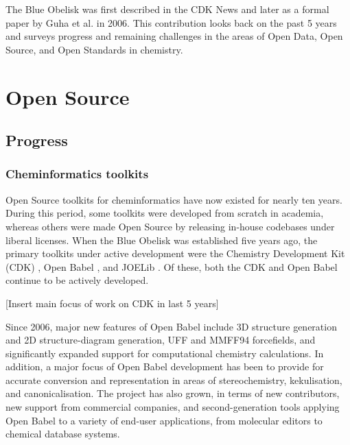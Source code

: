 \documentclass[10pt]{bmc_article}
\newenvironment{bmcformat}{\fussy\setboolean{publ}{true}}{\fussy}
\begin{document}
\begin{bmcformat}
The Blue Obelisk was first described in the CDK News \cite{CDKNewsBO} and
later as a formal paper by Guha et al.\cite{Guha2006} in
2006. This
contribution looks back on the past 5 years and surveys progress and
remaining challenges in the areas of Open Data, Open Source, and Open
Standards in chemistry.

\section*{Open Source}
  \subsection*{Progress}

\subsubsection*{Cheminformatics toolkits}

Open Source toolkits for cheminformatics have now existed for nearly
ten years. During this period, some toolkits were developed from
scratch in academia, whereas others were made Open Source by releasing in-house
codebases under liberal licenses. When the Blue Obelisk was
established five years ago, the primary toolkits under active development
were the Chemistry Development Kit (CDK)
\cite{Steinbeck2003, Steinbeck2006}, Open Babel \cite{WebOpenBabel},
and JOELib \cite{WebJOELib}. Of these, both the CDK and Open Babel
continue to be actively developed.

[Insert main focus of work on CDK in last 5 years]

Since 2006, major new features of Open Babel include 3D structure
generation and 2D structure-diagram generation, UFF and MMFF94
forcefields, and significantly expanded support for computational
chemistry calculations. In addition, a major focus of Open Babel development
has been to provide for accurate conversion and representation in
areas of stereochemistry, kekulisation, and canonicalisation. The
project has also grown, in terms of new contributors, new support from
commercial companies, and second-generation tools applying Open Babel
to a variety of end-user applications, from molecular editors to
chemical database systems.


\end{bmcformat}
\end{document}
